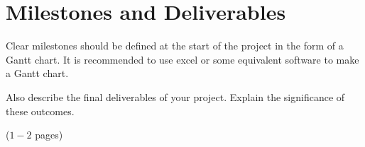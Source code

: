 
\chapter{Milestones and Deliverables}
\label{Chapter6}

Clear milestones should be defined at the start of the project in the form of a Gantt chart. It is recommended to use excel or some equivalent software to make a Gantt chart.

Also describe the final deliverables of your project. Explain the significance of these outcomes.

($1-2$ pages)